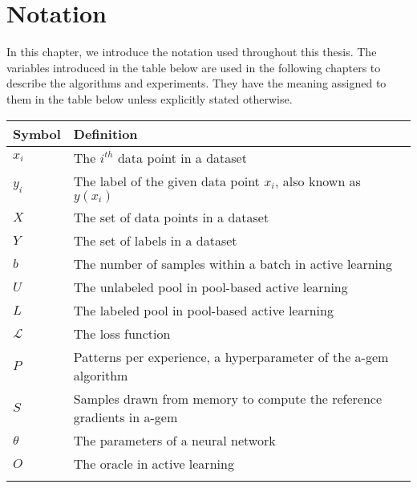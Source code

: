 \chapter{Notation}
\label{ch:notation}

In this chapter, we introduce the notation used throughout this thesis. The variables introduced in
the table below are used in the following chapters to describe the algorithms and experiments. They have
the meaning assigned to them in the table below unless explicitly stated otherwise.

\begin{tabularx}{\textwidth}{l X}
    \toprule
    Symbol & Definition \\
    \midrule
    $x_i$ & The $i^{th}$ data point in a dataset \\ \addlinespace
    $y_i$ & The label of the given data point $x_i$, also known as $y(x_i)$ \\ \addlinespace
    $X$ & The set of data points in a dataset \\ \addlinespace
    $Y$ & The set of labels in a dataset \\ \addlinespace
    $b$ & The number of samples within a batch in active learning \\ \addlinespace
    $U$ & The unlabeled pool in pool-based active learning\\ \addlinespace
    $L$ & The labeled pool in pool-based active learning\\ \addlinespace
    $\mathcal{L}$ & The loss function \\ \addlinespace
    $P$ & Patterns per experience, a hyperparameter of the \gls{a-gem} algorithm \\ \addlinespace
    $S$ & Samples drawn from memory to compute the reference gradients in \gls{a-gem} \\ \addlinespace
    $\theta$ & The parameters of a neural network \\ \addlinespace
    $O$ & The oracle in active learning \\ \addlinespace
    \bottomrule
\end{tabularx}
\label{tab:notation}